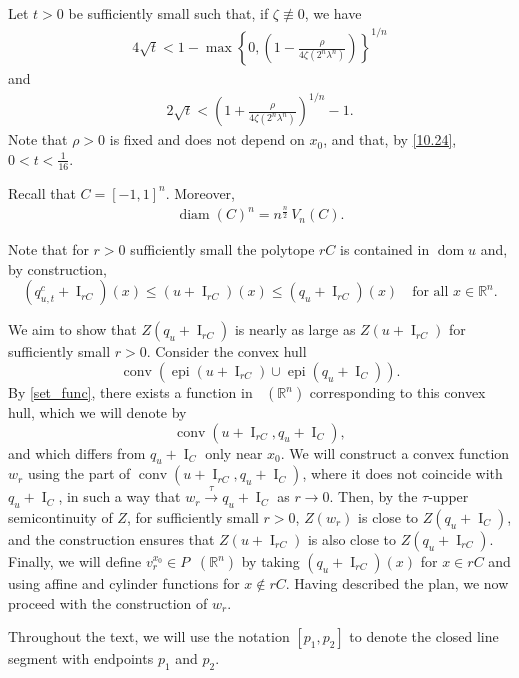 \documentclass[11pt]{article}
\theoremstyle{definition} %
\newcommand{\RR}{(\mathbb{R}^n)}
\DeclareMathOperator{\conv}{conv}
\DeclareMathOperator{\I}{I}
\DeclareMathOperator{\LQ}{_{l.q}}
\DeclareMathOperator{\dom}{dom}
\DeclareMathOperator{\epi}{epi}
\DeclareMathOperator{\LP}{Conv_{lp}}
\DeclareMathOperator{\diam}{diam}
\newcommand{\seq}{\xrightarrow{\tau}}
\begin{document}
Let $t>0$ be sufficiently small such that, if $\zeta \not\equiv 0$, we have 
\begin{align}\label{10.24}
  4\sqrt{t}< 1 - \max\left\{0, \left(1-\frac{\rho}{4\zeta(2^n\lambda^n)}\right)\right\}^{1/n} 
\end{align}
and 
\begin{align}\label{10.25}
    2\sqrt{t}<\left(1+\frac{\rho}{4\zeta(2^n\lambda^n)}\right)^{1/n}-1.
\end{align}
Note that $\rho>0$ is fixed and does not depend on $x_0$, and that, by \eqref{10.24}, $0<t<\frac{1}{16}$.



Recall that $C=[-1,1]^n$. Moreover, 
\begin{align}\label{eq10.26.}
   \diam(C)^n= n^{\frac{n}{2}}\, V_n(C).
\end{align}

Note that for $r>0$ sufficiently small the polytope $rC$ is contained in $\dom u$ and, by construction, 
$$
(q_{u,t}^c + \I_{rC})(x) \leq (u + \I_{rC})(x) \leq (q_u + \I_{rC})(x) \quad \text{for all } x \in \mathbb{R}^n.
$$



We aim to show that $Z(q_u+\I_{rC})$ is nearly as large as $Z(u + \I_{rC})$ for  sufficiently small $r>0$.  Consider the convex hull
$$\conv(\epi (u + \I_{rC})\cup\epi  (q_u+\I_C)).$$ 
By \eqref{set_func}, there exists a function  in $\LP(\mathbb{R}^n)$ corresponding to this convex hull,  which we will denote by
$$
\conv(u + \I_{rC}, q_u + \I_C),
$$
and which differs from $q_u + \I_C$ only near $x_0$.  We will construct a convex function  $w_r$ using the part of $\conv(u + \I_{rC}, q_u + \I_C)$, where it does not coincide with $q_u + \I_C$,   in such a way that $w_r \seq q_u+\I_C$ as $r\rightarrow 0$. Then, by the $\tau$-upper semicontinuity of $Z$,  for sufficiently small $r>0$,   $Z(w_r)$ is close to $Z(q_u+\I_C)$, and the construction ensures that $Z(u + \I_{rC})$ is also close to $Z(q_u + \I_{rC})$.  Finally, we will define $v_r^{x_0}\in P\LQ\RR$ by taking $(q_u+\I_{rC})(x)$ for $x\in rC$ and using affine and cylinder functions for $x\notin rC$.   Having described the plan, we now proceed with the construction of $w_r$.









Throughout the text, we will use the notation $[p_1,p_2]$ to denote the closed line segment with endpoints $p_1$ and $p_2$.
\end{document}
